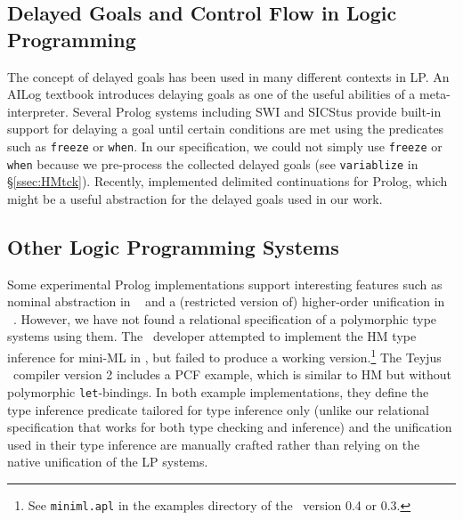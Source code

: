 \subsection{Delayed Goals and Control Flow in Logic Programming}
The concept of delayed goals has been used in many different contexts in LP.
An AILog
	 textbook \cite{AILogTextBook}
introduces delaying goals as one of the useful abilities of a meta-interpreter.
Several Prolog systems including SWI and SICStus provide built-in support for
delaying a goal until certain conditions are met using the predicates
such as {\small\verb|freeze|} or {\small\verb|when|}. In our specification,
we could not simply use {\small\verb|freeze|} or {\small\verb|when|}
because we pre-process the collected delayed goals (see \verb|variablize|
in \S\ref{ssec:HMtck}).
Recently, \citet{SchDemDesWei13} implemented delimited continuations for
Prolog, which might be a useful abstraction for the delayed goals 
used in our work.

\subsection{Other Logic Programming Systems}\label{ssec:otherLP}
Some experimental Prolog implementations support interesting features such as
nominal abstraction in \aProlog\ \cite{cheney04iclp} and a (restricted version
of) higher-order unification in \lProlog\ \cite{nadathur99cade}. However, we
have not found a relational specification of a polymorphic type systems using
them. The \aProlog\ developer attempted to implement the HM type inference for
mini-ML in \aProlog, but failed to produce a working version.\footnote{
	See \texttt{miniml.apl} in the examples directory of
	the \aProlog\ version 0.4 or 0.3.}
The Teyjus \lProlog\ compiler version 2 includes a PCF \cite{Scott69} example,
which is similar to HM but without polymorphic \texttt{let}-bindings.
In both example implementations, they define the type inference predicate
tailored for type inference only (unlike our relational specification that
works for both type checking and inference) and the unification used in
their type inference are manually crafted rather than relying on
the native unification of the LP systems.

